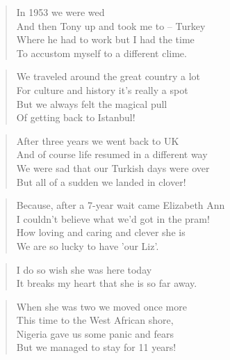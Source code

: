 \begin{verse}
In 1953 we were wed \\
And then Tony up and took me to -- Turkey \\
Where he had to work but I had the time \\
To accustom myself to a different clime. \\
\end{verse}

\begin{verse}
We traveled around the great country a lot \\
For culture and history it's really a spot \\
But we always felt the magical pull \\
Of getting back to Istanbul! \\
\end{verse}

\begin{verse}
After three years we went back to UK \\
And of course life resumed in a different way \\
We were sad that our Turkish days were over \\
But all of a sudden we landed in clover! \\
\end{verse}

\begin{verse}
Because, after a 7-year wait came Elizabeth Ann \\
I couldn't believe what we'd got in the pram! \\
How loving and caring and clever she is \\
We are so lucky to have 'our Liz'. \\
\end{verse}

\begin{verse}
I do so wish she was here today \\
It breaks my heart that she is so far away. \\
\end{verse}

\begin{verse}
When she was two we moved once more \\
This time to the West African shore, \\
Nigeria gave us some panic and fears \\
But we managed to stay for 11 years! \\
\end{verse}

